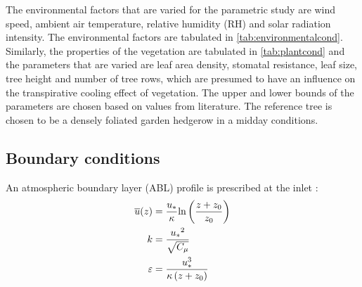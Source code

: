 

The environmental factors that are varied for the parametric study are wind speed, ambient air temperature, relative humidity (RH) and solar radiation intensity. The environmental factors are tabulated in \cref{tab:environmentalcond}.  Similarly, the properties of the vegetation are tabulated in \cref{tab:plantcond} and the parameters that are varied are leaf area density, stomatal resistance, leaf size, tree height and number of tree rows, which are presumed to have an influence on the transpirative cooling effect of vegetation. The upper and lower bounds of the parameters are chosen based on values from literature. The reference tree is chosen to be a densely foliated garden hedgerow in a midday conditions. 




\subsection{Boundary conditions}

An atmospheric boundary layer (ABL) profile is prescribed at the inlet \citep{Richards1993}:
\begin{align}
\overline{u}(z) &= \frac{{{u_*}}}{\kappa }{\text{ln}}\left( {\frac{{z + {z_0}}}{{{z_0}}}} \right) \\
k &= \frac{{{u_*}^2}}{{\sqrt {{C_\mu }} }} \\
\varepsilon  &= \frac{{u_*^3}}{{\kappa \left( {z + {z_0}} \right)}}
\end{align}

